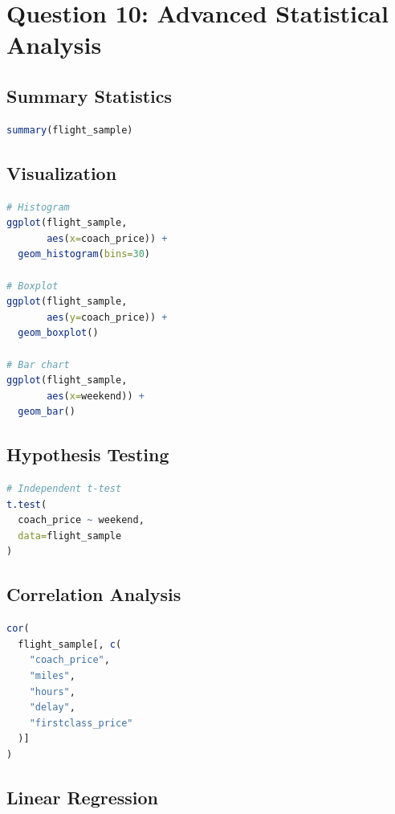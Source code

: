 \documentclass[12pt,a4paper]{article}
\begin{document}
\section{Question 10: Advanced Statistical Analysis}

\subsection{Summary Statistics}

\begin{lstlisting}[language=R]
summary(flight_sample)
\end{lstlisting}

\subsection{Visualization}

\begin{lstlisting}[language=R]
# Histogram
ggplot(flight_sample,
       aes(x=coach_price)) +
  geom_histogram(bins=30)

# Boxplot
ggplot(flight_sample,
       aes(y=coach_price)) +
  geom_boxplot()

# Bar chart
ggplot(flight_sample,
       aes(x=weekend)) +
  geom_bar()
\end{lstlisting}

\subsection{Hypothesis Testing}

\begin{lstlisting}[language=R]
# Independent t-test
t.test(
  coach_price ~ weekend,
  data=flight_sample
)
\end{lstlisting}

\subsection{Correlation Analysis}

\begin{lstlisting}[language=R]
cor(
  flight_sample[, c(
    "coach_price",
    "miles",
    "hours",
    "delay",
    "firstclass_price"
  )]
)
\end{lstlisting}

\subsection{Linear Regression}
\end{document}

